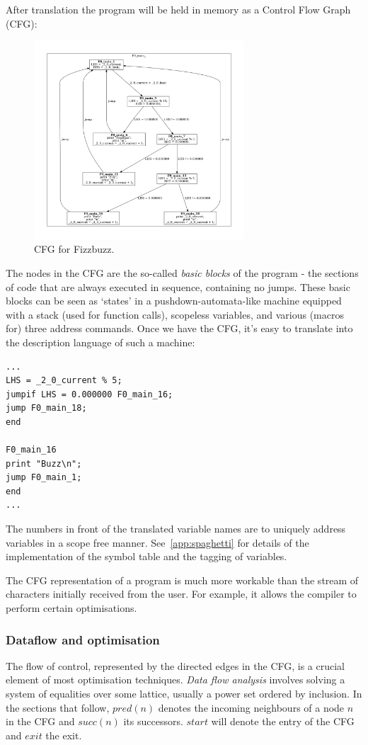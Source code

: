 \documentclass[12pt,a4paper]{article}
\begin{document}
 After translation the program will be held in memory as a Control Flow Graph (CFG):
 
\begin{figure}[H]
\centering
\includegraphics[width=0.7\textwidth]{images/fizzcfg}
\vspace{-1cm}
\caption{CFG for Fizzbuzz.}
\end{figure}

The nodes in the CFG are the so-called \textit{basic blocks} of the program - the sections of code that are always executed in sequence, containing no jumps.
These basic blocks can be seen as `states' in a pushdown-automata-like machine equipped with a stack (used for function calls), scopeless variables, and various (macros for) three address commands. Once we have the CFG, it's easy to translate into the description language of such a machine:

\begin{verbatim}
...
LHS = _2_0_current % 5;
jumpif LHS = 0.000000 F0_main_16;
jump F0_main_18;
end

F0_main_16
print "Buzz\n";
jump F0_main_1;
end
...
\end{verbatim}

The numbers in front of the translated variable names are to uniquely address variables in a scope free manner. See~\cref{app:spaghetti} for details of the implementation of the symbol table and the tagging of variables.

The CFG representation of a program is much more workable than the stream of characters initially received from the user. For example, it allows the compiler to perform certain optimisations.

\subsubsection{Dataflow and optimisation}
The flow of control, represented by the directed edges in the CFG, is a crucial element of most optimisation techniques. \textit{Data flow analysis} involves solving a system of equalities over some lattice, usually a power set ordered by inclusion. In the sections that follow,
$pred(n)$ denotes the incoming neighbours of a node $n$ in the CFG and $succ(n)$ its successors. $start$ will denote the entry of the CFG and $exit$ the exit.
\end{document}
